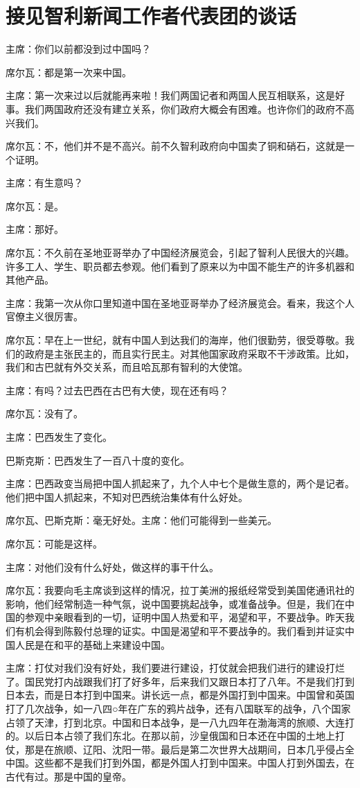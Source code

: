 \section[接见智利新闻工作者代表团的谈话（一九六四年六月二十三日）]{接见智利新闻工作者代表团的谈话}


主席：你们以前都没到过中国吗？

席尔瓦：都是第一次来中国。

主席：第一次来过以后就能再来啦！我们两国记者和两国人民互相联系，这是好事。我们两国政府还没有建立关系，你们政府大概会有困难。也许你们的政府不高兴我们。

席尔瓦：不，他们并不是不高兴。前不久智利政府向中国卖了铜和硝石，这就是一个证明。

主席：有生意吗？

席尔瓦：是。

主席：那好。

席尔瓦：不久前在圣地亚哥举办了中国经济展览会，引起了智利人民很大的兴趣。许多工人、学生、职员都去参观。他们看到了原来以为中国不能生产的许多机器和其他产品。

主席：我第一次从你口里知道中国在圣地亚哥举办了经济展览会。看来，我这个人官僚主义很厉害。

席尔瓦：早在上一世纪，就有中国人到达我们的海岸，他们很勤劳，很受尊敬。我们的政府是主张民主的，而且实行民主。对其他国家政府采取不干涉政策。比如，我们和古巴就有外交关系，而且哈瓦那有智利的大使馆。

主席：有吗？过去巴西在古巴有大使，现在还有吗？

席尔瓦：没有了。

主席：巴西发生了变化。

巴斯克斯：巴西发生了一百八十度的变化。

主席：巴西政变当局把中国人抓起来了，九个人中七个是做生意的，两个是记者。他们把中国人抓起来，不知对巴西统治集体有什么好处。

席尔瓦、巴斯克斯：毫无好处。主席：他们可能得到一些美元。

席尔瓦：可能是这样。

主席：对他们没有什么好处，做这样的事干什么。

席尔瓦：我要向毛主席谈到这样的情况，拉丁美洲的报纸经常受到美国佬通讯社的影响，他们经常制造一种气氛，说中国要挑起战争，或准备战争。但是，我们在中国的参观中亲眼看到的一切，证明中国人热爱和平，渴望和平，不要战争。昨天我们有机会得到陈毅付总理的证实。中国是渴望和平不要战争的。我们看到并证实中国人民是在和平的基础上来建设中国。

主席：打仗对我们没有好处，我们要进行建设，打仗就会把我们进行的建设打烂了。国民党打内战跟我们打了好多年，后来我们又跟日本打了八年。不是我们打到日本去，而是日本打到中国来。讲长远一点，都是外国打到中国来。中国曾和英国打了几次战争，如一八四○年在广东的鸦片战争，还有八国联军的战争，八个国家占领了天津，打到北京。中国和日本战争，是一八九四年在渤海湾的旅顺、大连打的。以后日本占领了我们东北。在那以前，沙皇俄国和日本还在中国的土地上打仗，那是在旅顺、辽阳、沈阳一带。最后是第二次世界大战期间，日本几乎侵占全中国。这些都不是我们打到外国，都是外国人打到中国来。中国人打到外国去，在古代有过。那是中国的皇帝。

